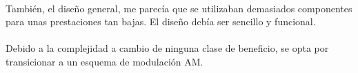 \paragraph{}
También, el diseño general, me parecía que se utilizaban demasiados componentes para unas prestaciones tan bajas. El diseño debía ser sencillo y funcional.
\paragraph{}
Debido a la complejidad a cambio de ninguna clase de beneficio, se opta por transicionar a un esquema de modulaci\'on AM.
